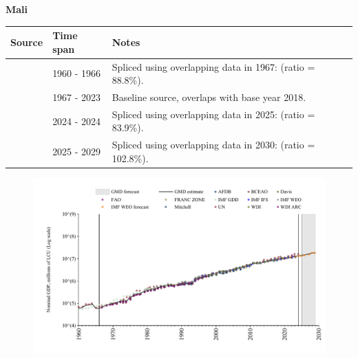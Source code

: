 \documentclass[12pt,a4paper,landscape]{article}
\begin{document}
\begin{adjustbox}{max totalsize={\paperwidth}{\paperheight},center}
\begin{minipage}[t][\textheight][t]{\textwidth}
\vspace*{0.5cm}
{}
\begin{center}
{\Large\bfseries Mali}
\end{center}
\vspace{0.5cm}
\begin{table}[H]
\centering
\small
\begin{tabular}{|l|l|l|}
\hline
\textbf{Source} & \textbf{Time span} & \textbf{Notes} \\
\hline
\rowcolor{white}\cite{BCEAO}& 1960 - 1966 &Spliced using overlapping data in 1967: (ratio = 88.8\%).\\
\rowcolor{lightgray}\cite{WDI}& 1967 - 2023 &Baseline source, overlaps with base year 2018.\\
\rowcolor{white}\cite{BCEAO}& 2024 - 2024 &Spliced using overlapping data in 2025: (ratio = 83.9\%).\\
\rowcolor{lightgray}\cite{IMF_WEO_forecast}& 2025 - 2029 &Spliced using overlapping data in 2030: (ratio = 102.8\%).\\
\hline
\end{tabular}
\end{table}
\begin{figure}[H]
\centering
\includegraphics[width=\textwidth,height=0.6\textheight,keepaspectratio]{graphs/MLI_nGDP.pdf}
\end{figure}
\end{minipage}
\end{adjustbox}
\end{document}
